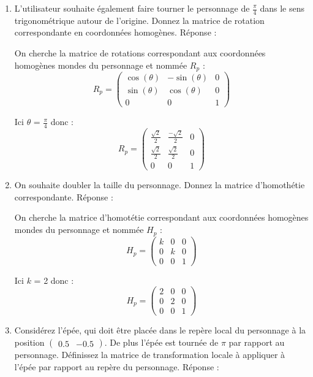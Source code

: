 \documentclass[a4paper,12pt]{article}
\begin{document}
\begin{enumerate}
    \item L'utilisateur souhaite également faire tourner le personnage de \(\frac{\pi}{4}\) dans le sens trigonométrique autour de l'origine. Donnez la matrice de rotation correspondante en coordonnées homogènes. \label{exo:1.2}\newline \newline
Réponse :

On cherche la matrice de rotations correspondant aux coordonnées homogènes mondes du personnage et nommée $R_p$ : 
\[
R_p = 
\begin{pmatrix}
\cos(\theta) & -\sin(\theta) & 0 \\
\sin(\theta) & \cos(\theta) & 0 \\
0 & 0 & 1
\end{pmatrix}\]

Ici \(\theta\) = \(\frac{\pi}{4}\) donc : \newline
\[\boxed{
R_p = 
\begin{pmatrix}
\frac{\sqrt{2}}{2} & \frac{-\sqrt{2}}{2} & 0 \\
\frac{\sqrt{2}}{2} & \frac{\sqrt{2}}{2} & 0 \\
0 & 0 & 1
\end{pmatrix}}\] \newline
    \item On souhaite doubler la taille du personnage. Donnez la matrice d'homothétie correspondante.\newline \newline
Réponse :

On cherche la matrice d'homotétie correspondant aux coordonnées homogènes mondes du personnage et nommée $H_p$ : 
\[
H_p = 
\begin{pmatrix}
k & 0 & 0 \\
0 & k & 0 \\
0 & 0 & 1
\end{pmatrix}\]

Ici $k$ = 2 donc : 
\[\boxed{
H_p = 
\begin{pmatrix}
2 & 0 & 0 \\
0 & 2 & 0 \\
0 & 0 & 1
\end{pmatrix}}\] \newline

    \item Considérez l'épée, qui doit être placée dans le repère local du personnage à la position $\begin{pmatrix} 0.5 & -0.5 \end{pmatrix}$. De plus l'épée est tournée de $\pi$ par rapport au personnage. Définissez la matrice de transformation locale à appliquer à l'épée par rapport au repère du personnage.\newline \newline
Réponse :


\end{enumerate}
\end{document}

